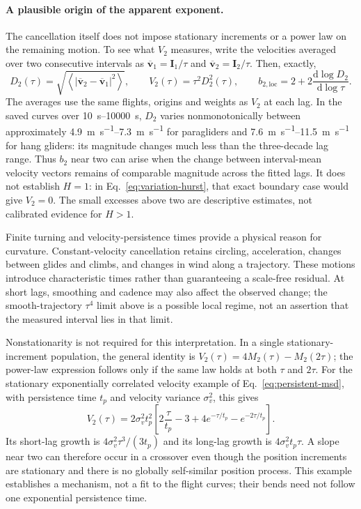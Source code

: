 \paragraph{A plausible origin of the apparent exponent.}
The cancellation itself does not impose stationary increments or a power law
on the remaining motion. To see what $V_2$ measures, write the velocities averaged
over two consecutive intervals as $\overline{\mathbf v}_1=\mathbf I_1/\tau$
and $\overline{\mathbf v}_2=\mathbf I_2/\tau$. Then, exactly,
\[
 D_2(\tau)=
 \sqrt{\left\langle|\overline{\mathbf v}_2-
                         \overline{\mathbf v}_1|^2\right\rangle},
 \qquad V_2(\tau)=\tau^2D_2^2(\tau),\qquad
 b_{2,\mathrm{loc}}=2+2\frac{\mathrm d\log D_2}{\mathrm d\log\tau}.
\]
The averages use the same flights, origins and weights as $V_2$ at each lag.
In the saved curves over \SIrange{10}{10000}{\second}, $D_2$ varies
nonmonotonically between approximately \SIrange{4.9}{7.3}{\metre\per\second}
for paragliders and \SIrange{7.6}{11.5}{\metre\per\second} for hang gliders:
its magnitude changes much less than the three-decade lag range.
Thus $b_2$ near two can arise when the change between interval-mean velocity
vectors remains of comparable magnitude across the fitted lags. It does not
establish $H=1$: in Eq.~\eqref{eq:variation-hurst}, that exact boundary case
would give $V_2=0$. The small excesses above two are descriptive estimates,
not calibrated evidence for $H>1$.

Finite turning and velocity-persistence times provide a physical reason for
curvature. Constant-velocity cancellation retains circling, acceleration,
changes between glides and climbs, and changes in wind along a trajectory.
These motions introduce characteristic times rather than guaranteeing a
scale-free residual. At short lags, smoothing and cadence may also affect the
observed change; the smooth-trajectory $\tau^4$ limit above is a possible local
regime, not an assertion that the measured interval lies in that limit.

Nonstationarity is not required for this interpretation. In a single
stationary-increment population, the general identity is
$V_2(\tau)=4M_2(\tau)-M_2(2\tau)$; the power-law expression follows only if
the same law holds at both $\tau$ and $2\tau$. For the stationary exponentially
correlated velocity example of Eq.~\eqref{eq:persistent-msd}, with persistence
time $t_p$ and velocity variance $\sigma_v^2$, this gives
\[
 V_2(\tau)=2\sigma_v^2t_p^2
 \left[2\frac{\tau}{t_p}-3+4e^{-\tau/t_p}-e^{-2\tau/t_p}\right].
\]
Its short-lag growth is $4\sigma_v^2\tau^3/(3t_p)$ and its long-lag growth is
$4\sigma_v^2t_p\tau$. A slope near two can therefore occur in a crossover
even though the position increments are stationary and there is no globally
self-similar position process. This example establishes a mechanism, not a fit
to the flight curves; their bends need not follow one exponential persistence
time.

